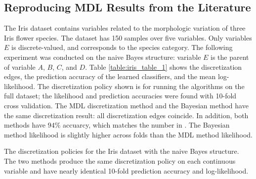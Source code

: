 \subsection*{Reproducing MDL Results from the Literature}

The Iris dataset contains variables related to the morphologic variation of three Iris flower species.
The dataset has \num{150} samples over five variables.
Only variables $E$ is discrete-valued, and corresponds to the species category.
The following experiment was conducted on the naive Bayes structure: variable $E$ is the parent of variable $A$, $B$, $C$, and $D$. Table \ref{table:iris_table_1} shows the discretization edges, the prediction accuracy of the learned classifiers, and the mean log-likelihood.
The discretization policy shown is for running the algorithms on the full dataset; the likelihood and prediction accuracies were found with 10-fold cross validation.
The MDL discretization method and the Bayesian method have the same discretization result: all discretization edges coincide. In addition, both methods have $94 \%$ accuarcy, which matches the number in \cite{Friedman_1996}.
The Bayesian method likelihood is slightly higher across folds than the MDL method likelihood.

\begin{table}[ht]
  \centering
  \caption{
    The discretization policies for the Iris dataset with the naive Bayes structure.
    The two methods produce the same discretization policy on each continuous variable and have nearly identical 10-fold prediction accuracy and log-likelihood.
  }

  \label{table:iris_table_1}
\end{table}


